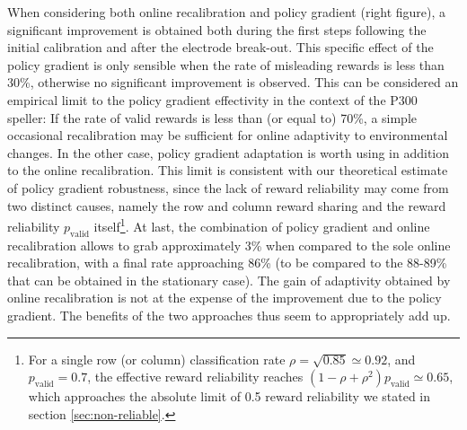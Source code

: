 \documentclass[conference]{IEEEtran}
\begin{document}
When considering both online recalibration and policy gradient (right figure), a significant improvement is obtained both during the first steps 
following the initial calibration and after the electrode break-out.
This specific effect of the policy gradient is only sensible when the rate of misleading rewards is less than 30\%, otherwise no 
significant improvement is observed.
This can be considered an empirical limit to the policy gradient effectivity in the context of the
P300 speller: If the rate of valid rewards is
less than (or equal to) 70\%, a simple occasional recalibration may be sufficient for online adaptivity to environmental
changes. In the other case,  policy gradient adaptation is worth using in addition to the online recalibration.
This limit is consistent with our theoretical estimate of policy gradient robustness, since the lack of reward reliability may come from 
two distinct causes, namely the 
row and column reward sharing and the reward reliability $p_\text{valid}$ itself\footnote{
For a single row (or column) classification rate $\rho = \sqrt{0.85} \simeq 0.92$, and $p_\text{valid} = 0.7$, 
the effective reward reliability reaches
$(1-\rho+\rho^2) p_\text{valid}\simeq 0.65$, 
which approaches the absolute limit of 0.5 reward reliability we 
stated in section \ref{sec:non-reliable}.
}. 
At last, the combination of policy gradient and online recalibration allows to grab approximately 3\% 
when compared to the sole online recalibration, with a final rate approaching 86\% (to be compared to the 88-89\% 
that can be obtained in the stationary case).
The gain of adaptivity obtained by online recalibration is not at the expense of the improvement
due to the policy gradient. The benefits of the two approaches thus seem to appropriately add up.


\end{document}
